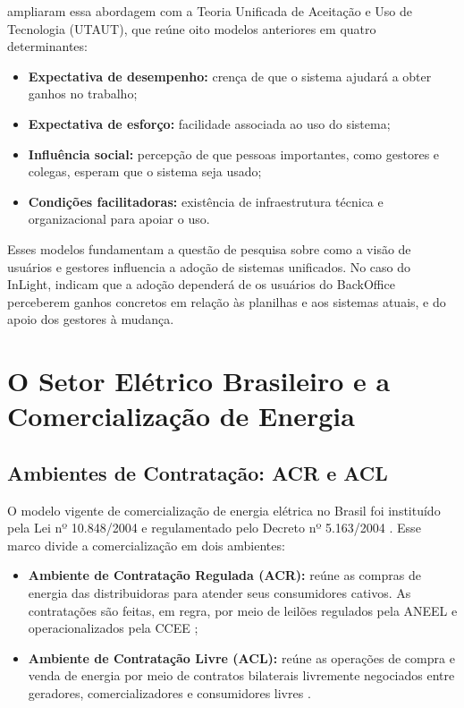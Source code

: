 \citet{venkatesh2003} ampliaram essa abordagem com a Teoria Unificada de Aceitação e Uso de Tecnologia (UTAUT), que reúne oito modelos anteriores em quatro determinantes:

\begin{itemize}
    \item \textbf{Expectativa de desempenho:} crença de que o sistema ajudará a obter ganhos no trabalho;
    \item \textbf{Expectativa de esforço:} facilidade associada ao uso do sistema;
    \item \textbf{Influência social:} percepção de que pessoas importantes, como gestores e colegas, esperam que o sistema seja usado;
    \item \textbf{Condições facilitadoras:} existência de infraestrutura técnica e organizacional para apoiar o uso.
\end{itemize}

Esses modelos fundamentam a questão de pesquisa sobre como a visão de usuários e gestores influencia a adoção de sistemas unificados. No caso do InLight, indicam que a adoção dependerá de os usuários do BackOffice perceberem ganhos concretos em relação às planilhas e aos sistemas atuais, e do apoio dos gestores à mudança.

\section{O Setor Elétrico Brasileiro e a Comercialização de Energia}
\label{sec:setor}

\subsection{Ambientes de Contratação: ACR e ACL}

O modelo vigente de comercialização de energia elétrica no Brasil foi instituído pela Lei nº 10.848/2004 \citep{brasil2004lei} e regulamentado pelo Decreto nº 5.163/2004 \citep{brasil2004decreto}. Esse marco divide a comercialização em dois ambientes:

\begin{itemize}
    \item \textbf{Ambiente de Contratação Regulada (ACR):} reúne as compras de energia das distribuidoras para atender seus consumidores cativos. As contratações são feitas, em regra, por meio de leilões regulados pela ANEEL e operacionalizados pela CCEE \citep{brasil2004lei};
    \item \textbf{Ambiente de Contratação Livre (ACL):} reúne as operações de compra e venda de energia por meio de contratos bilaterais livremente negociados entre geradores, comercializadores e consumidores livres \citep{brasil2004decreto}.
\end{itemize}

